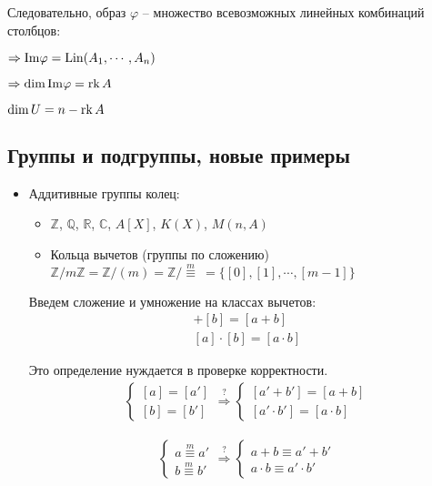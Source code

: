 Следовательно, образ $\varphi$ – множество всевозможных линейных комбинаций столбцов: 

$\Rightarrow \mathrm{{Im}{\varphi}} = \operatorname{Lin}(A_1, \cdots, A_n)$

$\Rightarrow \dim{\mathrm{{Im}{\varphi}}} =\operatorname{rk} A$

\follow 
$\dim{U} = n - \operatorname{rk} A$


\subsection{Группы и подгруппы, новые примеры}
\begin{itemize}

\item Аддитивные группы колец:

\begin{itemize}
\item $\mathbb{Z}$, $\mathbb{Q}$, $\mathbb{R}$, $\mathbb{C}$, $A[X]$, $K(X)$, $M(n, A)$
\item Кольца вычетов (группы по сложению) $\mathbb{Z}/m\mathbb{Z} = \mathbb{Z}/(m) = \mathbb{Z}/\stackrel{m}{\equiv}\ = \{ [0], [1], \cdots, [m-1] \}$
\end{itemize}

Введем сложение и умножение на классах вычетов: 
\begin{gather*}
  [a] + [b] = [a + b] \\
  [a]\cdot [b] = [a \cdot b]
\end{gather*}

Это определение нуждается в проверке корректности.
\begin{gather*}
\begin{cases}
    [a] = [a']  \\
    [b] = [b']
\end{cases}
\stackrel{?}{\Rightarrow}
\begin{cases}
  [a' + b'] = [a + b]  \\
  [a' \cdot b'] = [a \cdot b]
\end{cases}
\end{gather*}

\begin{gather*}
\begin{cases}
  a \stackrel{m}{\equiv} a' \\
  b \stackrel{m}{\equiv} b'
\end{cases}
\stackrel{?}{\Rightarrow}
\begin{cases}
  a + b \equiv a' + b' \\ 
  a \cdot b \equiv a' \cdot b'
\end{cases}
\end{gather*}


\end{itemize}
